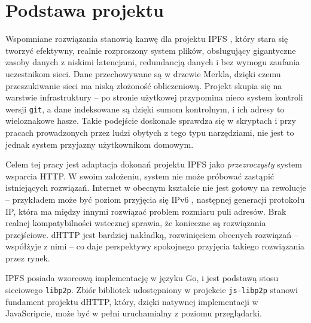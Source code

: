 \section{Podstawa projektu}
\label{sec:podstawaProjektu}

Wspomniane rozwiązania stanowią kanwę dla projektu IPFS \cite{ipfsWP}, który stara się tworzyć efektywny, realnie rozproszony system plików, obsługujący gigantyczne zasoby danych z niskimi latencjami, redundancją danych i bez wymogu zaufania uczestnikom sieci.  Dane przechowywane są w drzewie Merkla, dzięki czemu przeszukiwanie sieci ma niską złożoność obliczeniową. Projekt skupia się na warstwie infrastruktury – po stronie użytkowej przypomina nieco system kontroli wersji \texttt{git}, a dane indeksowane są dzięki sumom kontrolnym, i ich adresy to wieloznakowe hasze. Takie podejście doskonale sprawdza się w skryptach i przy pracach prowadzonych przez ludzi obytych z tego typu narzędziami, nie jest to jednak system przyjazny użytkownikom domowym.

Celem tej pracy jest adaptacja dokonań projektu IPFS jako {\em przezroczysty} system wsparcia HTTP. W swoim założeniu, system nie może próbować zastąpić istniejących rozwiązań. Internet w obecnym kształcie nie jest gotowy na rewolucje – przykładem może być poziom przyjęcia się IPv6 \cite{googleipv6}, następnej generacji protokołu IP, która ma między innymi rozwiązać problem rozmiaru puli adresów. Brak realnej kompatybilności wstecznej sprawia, że konieczne są rozwiązania przejściowe. dHTTP jest bardziej nakładką, rozwinięciem obecnych rozwiązań -- współżyje z nimi -- co daje perspektywy spokojnego przyjęcia takiego rozwiązania przez rynek.

IPFS posiada wzorcową implementację w języku Go, i jest podstawą stosu sieciowego \texttt{libp2p}. Zbiór bibliotek udostępniony w projekcie \texttt{js-libp2p} stanowi fundament projektu dHTTP, który, dzięki natywnej implementacji w JavaScripcie, może być w pełni uruchamialny z poziomu przeglądarki.
